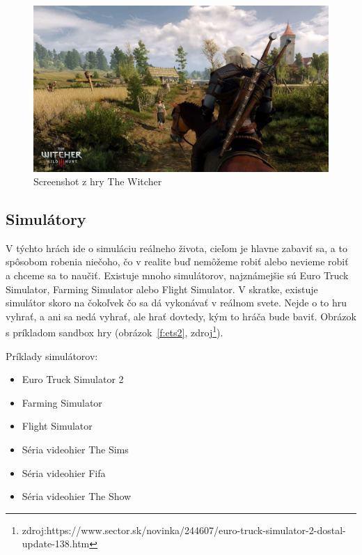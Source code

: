 \documentclass[10pt,oneside,slovak,a4paper]{article}
\begin{document}
\begin{figure}[h]
\centering
\includegraphics[scale=0.15]{rpg.jpg}
\caption{Screenshot z hry The Witcher}
\label{f:rpg}
\end{figure}


\subsection{Simulátory} \label{zanre:simulatory}

V týchto hrách ide o simuláciu reálneho života, cieľom je hlavne zabaviť sa, a to spôsobom robenia niečoho, čo v realite buď nemôžeme robiť alebo nevieme robiť a chceme sa to naučiť. Existuje mnoho simulátorov, najznámejšie sú Euro Truck Simulator, Farming Simulator alebo Flight Simulator. V skratke, existuje simulátor skoro na čokoľvek čo sa dá vykonávať v reálnom svete. Nejde o to hru vyhrať, a ani sa nedá vyhrať, ale hrať dovtedy, kým to hráča bude baviť. Obrázok s príkladom sandbox hry (obrázok~\ref{f:ets2}, zdroj\footnote{zdroj:https://www.sector.sk/novinka/244607/euro-truck-simulator-2-dostal-update-138.htm}).

Príklady simulátorov:
\begin{itemize}
\item Euro Truck Simulator 2
\item Farming Simulator
\item Flight Simulator
\item Séria videohier The Sims
\item Séria videohier Fifa
\item Séria videohier The Show
\end{itemize}
\end{document}
